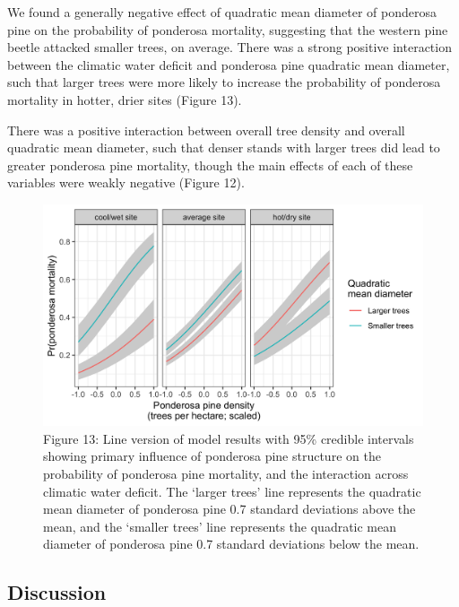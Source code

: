 \documentclass[]{article}
\begin{document}
We found a generally negative effect of quadratic mean diameter of
ponderosa pine on the probability of ponderosa mortality, suggesting
that the western pine beetle attacked smaller trees, on average. There
was a strong positive interaction between the climatic water deficit and
ponderosa pine quadratic mean diameter, such that larger trees were more
likely to increase the probability of ponderosa mortality in hotter,
drier sites (Figure 13).

There was a positive interaction between overall tree density and
overall quadratic mean diameter, such that denser stands with larger
trees did lead to greater ponderosa pine mortality, though the main
effects of each of these variables were weakly negative (Figure 12).

\begin{figure}
\centering
\includegraphics{../../figures/pipo_tpha_qmd_cwd_interaction.png}
\caption{Figure 13: Line version of model results with 95\% credible
intervals showing primary influence of ponderosa pine structure on the
probability of ponderosa pine mortality, and the interaction across
climatic water deficit. The `larger trees' line represents the quadratic
mean diameter of ponderosa pine 0.7 standard deviations above the mean,
and the `smaller trees' line represents the quadratic mean diameter of
ponderosa pine 0.7 standard deviations below the mean.}
\end{figure}

\subsection{Discussion}\label{discussion}
\end{document}
